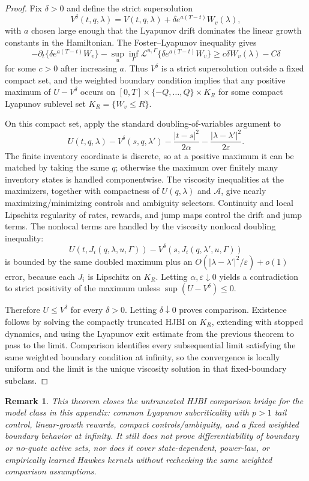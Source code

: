 \documentclass[11pt]{article}
\newtheorem{remark}{Remark}
\begin{document}
\begin{proof}
Fix $\delta>0$ and define the strict supersolution
\[
V^\delta(t,q,\lambda)
=V(t,q,\lambda)+\delta e^{a(T-t)}W_v(\lambda),
\]
with $a$ chosen large enough that the Lyapunov drift dominates the linear
growth constants in the Hamiltonian. The Foster--Lyapunov inequality gives
\[
-\partial_t\{\delta e^{a(T-t)}W_v\}
-\sup_u\inf_\Gamma \mathcal L^{u,\Gamma}
\{\delta e^{a(T-t)}W_v\}
\ge c\delta W_v(\lambda)-C\delta
\]
for some $c>0$ after increasing $a$. Thus $V^\delta$ is a strict
supersolution outside a fixed compact set, and the weighted boundary condition
implies that any positive maximum of $U-V^\delta$ occurs on
$[0,T]\times\{-Q,\ldots,Q\}\times K_R$ for some compact Lyapunov sublevel set
$K_R=\{W_v\le R\}$.

On this compact set, apply the standard doubling-of-variables argument to
\[
U(t,q,\lambda)-V^\delta(s,q,\lambda')
-\frac{|t-s|^2}{2\alpha}
-\frac{|\lambda-\lambda'|^2}{2\varepsilon}.
\]
The finite inventory coordinate is discrete, so at a positive maximum it can
be matched by taking the same $q$; otherwise the maximum over finitely many
inventory states is handled componentwise. The viscosity inequalities at the
maximizers, together with compactness of $U(q,\lambda)$ and $\mathcal A$, give
nearly maximizing/minimizing controls and ambiguity selectors. Continuity and
local Lipschitz regularity of rates, rewards, and jump maps control the drift
and jump terms. The nonlocal terms are handled by the viscosity nonlocal
doubling inequality:
\[
U(t,J_i(q,\lambda,u,\Gamma))-V^\delta(s,J_i(q,\lambda',u,\Gamma))
\]
is bounded by the same doubled maximum plus an
$O(|\lambda-\lambda'|^2/\varepsilon)+o(1)$ error, because each $J_i$ is
Lipschitz on $K_R$. Letting $\alpha,\varepsilon\downarrow0$ yields a
contradiction to strict positivity of the maximum unless
$\sup(U-V^\delta)\le0$.

Therefore $U\le V^\delta$ for every $\delta>0$. Letting
$\delta\downarrow0$ proves comparison. Existence follows by solving the
compactly truncated HJBI on $K_R$, extending with stopped dynamics, and using
the Lyapunov exit estimate from the previous theorem to pass to the limit.
Comparison identifies every subsequential limit satisfying the same weighted
boundary condition at infinity, so the convergence is locally uniform and the
limit is the unique viscosity solution in that fixed-boundary subclass.
\end{proof}

\begin{remark}
This theorem closes the untruncated HJBI comparison bridge for the model class
in this appendix: common Lyapunov subcriticality with $p>1$ tail control,
linear-growth rewards, compact controls/ambiguity, and a fixed weighted
boundary behavior at infinity. It still does not prove differentiability of
boundary or no-quote active sets, nor does it cover state-dependent, power-law,
or empirically learned Hawkes kernels without rechecking the same weighted
comparison assumptions.
\end{remark}
\end{document}
